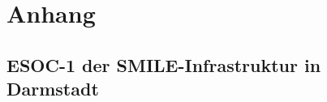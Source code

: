 \appendix
{}
\setcounter{page}{16}
\section{Anhang}

\subsection{ESOC-1 der SMILE-Infrastruktur in Darmstadt}